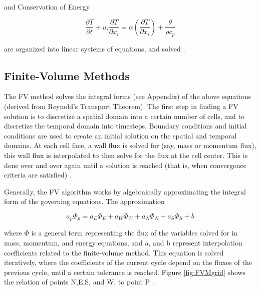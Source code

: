 \documentclass{UCF_ETD}
\begin{document}
and Conservation of Energy

\begin{equation}
    \frac{\partial T}{\partial t}+u_i\frac{\partial T}{\partial x_i}=\alpha\left(\frac{\partial T}{\partial x_i}\right)+\frac{\theta}{\rho c_p}
    \label{eq:ConsEnergy}
\end{equation}


are organized into linear systems of equations, and solved \cite{Anderson1995}. 

\subsection{Finite-Volume Methods}
\label{sec:FVM}

The FV method solves the integral forms (see Appendix) of the above equations (derived from Reynold’s Transport Theorem). The first step in finding a FV solution is to discretize a spatial domain into a certain number of cells, and to discretize the temporal domain into timesteps. Boundary conditions and initial conditions are used to create an initial solution on the spatial and temporal domains. At each cell face, a wall flux is solved for (say, mass or momentum flux), this wall flux is interpolated to then solve for the flux at the cell center. This is done over and over again until a solution is reached (that is, when convergence criteria are satisfied) \cite{Anderson1995}.

Generally, the FV algorithm works by algebraically approximating the integral form of the governing equations. The approximation

\begin{equation}
    a_p\Phi_p=a_E\Phi_E+a_W\Phi_W+a_N\Phi_N+a_S\Phi_S+b
    \label{eq:Finite-Volume_approximation}
\end{equation}

where $\Phi$ is a general term representing the flux of the variables solved for in mass, momentum, and energy equations, and a, and b represent interpolation coefficients related to the finite-volume method. This equation is solved iteratively, where the coefficients of the current cycle depend on the fluxes of the previous cycle, until a certain tolerance is reached. Figure \ref{fig:FVMgrid} shows the relation of points N,E,S, and W, to point P \cite{SIMPLEC}.
\end{document}
